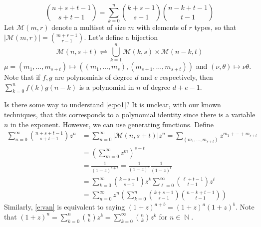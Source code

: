 \documentclass[11pt, a4paper]{memoir}
\DeclareMathOperator{\N}{{\mathbb{N}}}
\theoremstyle{change}
\theoremstyle{plain}
\theoremstyle{nonumberplain}
\numberwithin{equation}{section}
\begin{document}
\begin{enumerate}
\begin{equation*}
            \binom{n+s+t-1}{s+t-1}=\sum_{k=0}^n\binom{k+s-1}{s-1}\binom{n-k+t-1}{t-1}
        \end{equation*}
        Let $\mathcal{M}(m,r)$ denote a multiset of size $m$ with elements of $r$ types, so that $|\mathcal{M}(m,r)|=\binom{m+r-1}{r-1}$.
        Let's define a bijection
        \begin{equation}\label{e:po1}
            \mathcal{M}(n,s+t)\rightleftharpoons\bigcup_{k=1}^n\mathcal{M}(k,s)\times\mathcal{M}(n-k,t)
        \end{equation}
        $\mu=(m_1,\ldots,m_{s+t})\mapsto ((m_1,\ldots,m_s),(m_{s+1},\ldots,m_{s+t}))$ and $(\nu,\theta)\mapsto \nu\theta$.
        Note that if $f,g$ are polynomials of degree $d$ and $e$ respectively, then $\sum_{k=0}^nf(k)g(n-k)$ is a polynomial in $n$ of degree $d+e-1$.

        Is there some way to understand  \cref{e:po1}?
        It is unclear, with our known techniques, that this corresponds to a polynomial identity since there is a variable $n$ in the exponent.
        However, we can use generating functions.
        Define
        \begin{align*}
            \sum_{n=0}^\infty\binom{n+s+t-1}{s+t-1}z^n &= \sum_{n=0}^\infty|\mathcal{M}(n,s+t)|z^n= \sum_{(m_1,\ldots,m_{s+t})}z^{m_1+\cdots+m_{s+t}}\\
                                                       &= \left(\sum_{m=0}^\infty z^m\right)^{s+t}\\
                                                       &= \frac{1}{(1-z)^{s+t}}=\frac{1}{(1-z)^s}\frac{1}{(1-z)^t}\\
                                                       &= \sum_{k=0}^\infty\binom{k+s-1}{s-1}z^k\sum_{\ell=0}^\infty\binom{\ell+t-1}{t-1}z^\ell\\
                                                       &= \sum_{n=0}^\infty z^n\left(\sum_{k=0}^n\binom{k+s-1}{s-1}\binom{n-k+t-1}{t-1}\right)
        \end{align*}
        Similarly, \cref{e:van} is equivalent to saying $(1+z)^{a+b}=(1+z)^a(1+z)^b$.
        Note that $(1+z)^n=\sum_{k=0}^n\binom{n}{k}z^k=\sum_{k=0}^\infty\binom{n}{k}z^k$ for $n\in\N$.


\end{enumerate}
\end{document}
